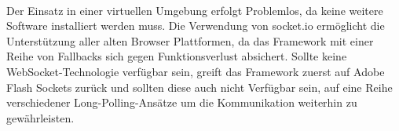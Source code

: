 \\Der Einsatz in einer virtuellen Umgebung erfolgt Problemlos, da keine weitere Software installiert werden muss. Die Verwendung von socket.io ermöglicht die Unterstützung aller alten Browser Plattformen, da das \Gls{Framework} mit einer Reihe von Fallbacks sich gegen Funktionsverlust absichert. Sollte keine WebSocket-Technologie verfügbar sein, greift das \Gls{Framework} zuerst auf Adobe Flash Sockets zurück und sollten diese auch nicht Verfügbar sein, auf eine Reihe verschiedener Long-Polling-Ansätze um die Kommunikation weiterhin zu gewährleisten.












